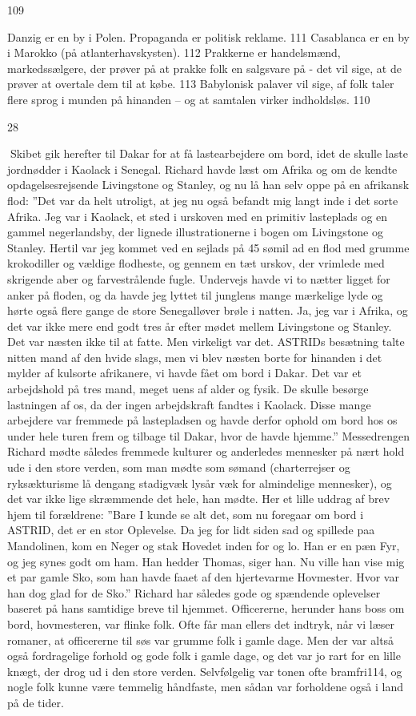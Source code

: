 109

Danzig er en by i Polen. Propaganda er politisk reklame. 111 Casablanca
er en by i Marokko (på atlanterhavskysten). 112 Prakkerne er
handelsmænd, markedssælgere, der prøver på at prakke folk en salgsvare
på - det vil sige, at de prøver at overtale dem til at købe. 113
Babylonisk palaver vil sige, af folk taler flere sprog i munden på
hinanden -- og at samtalen virker indholdsløs. 110

28

Skibet gik herefter til Dakar for at få lastearbejdere om bord, idet de
skulle laste jordnødder i Kaolack i Senegal. Richard havde læst om
Afrika og om de kendte opdagelsesrejsende Livingstone og Stanley, og nu
lå han selv oppe på en afrikansk flod: ''Det var da helt utroligt, at
jeg nu også befandt mig langt inde i det sorte Afrika. Jeg var i
Kaolack, et sted i urskoven med en primitiv lasteplads og en gammel
negerlandsby, der lignede illustrationerne i bogen om Livingstone og
Stanley. Hertil var jeg kommet ved en sejlads på 45 sømil ad en flod med
grumme krokodiller og vældige flodheste, og gennem en tæt urskov, der
vrimlede med skrigende aber og farvestrålende fugle. Undervejs havde vi
to nætter ligget for anker på floden, og da havde jeg lyttet til
junglens mange mærkelige lyde og hørte også flere gange de store
Senegalløver brøle i natten. Ja, jeg var i Afrika, og det var ikke mere
end godt tres år efter mødet mellem Livingstone og Stanley. Det var
næsten ikke til at fatte. Men virkeligt var det. ASTRIDs besætning talte
nitten mand af den hvide slags, men vi blev næsten borte for hinanden i
det mylder af kulsorte afrikanere, vi havde fået om bord i Dakar. Det
var et arbejdshold på tres mand, meget uens af alder og fysik. De skulle
besørge lastningen af os, da der ingen arbejdskraft fandtes i Kaolack.
Disse mange arbejdere var fremmede på lastepladsen og havde derfor
ophold om bord hos os under hele turen frem og tilbage til Dakar, hvor
de havde hjemme.'' Messedrengen Richard mødte således fremmede kulturer
og anderledes mennesker på nært hold ude i den store verden, som man
mødte som sømand (charterrejser og ryksækturisme lå dengang stadigvæk
lysår væk for almindelige mennesker), og det var ikke lige skræmmende
det hele, han mødte. Her et lille uddrag af brev hjem til forældrene:
''Bare I kunde se alt det, som nu foregaar om bord i ASTRID, det er en
stor Oplevelse. Da jeg for lidt siden sad og spillede paa Mandolinen,
kom en Neger og stak Hovedet inden for og lo. Han er en pæn Fyr, og jeg
synes godt om ham. Han hedder Thomas, siger han. Nu ville han vise mig
et par gamle Sko, som han havde faaet af den hjertevarme Hovmester. Hvor
var han dog glad for de Sko.'' Richard har således gode og spændende
oplevelser baseret på hans samtidige breve til hjemmet. Officererne,
herunder hans boss om bord, hovmesteren, var flinke folk. Ofte får man
ellers det indtryk, når vi læser romaner, at officererne til søs var
grumme folk i gamle dage. Men der var altså også fordragelige forhold og
gode folk i gamle dage, og det var jo rart for en lille knægt, der drog
ud i den store verden. Selvfølgelig var tonen ofte bramfri114, og nogle
folk kunne være temmelig håndfaste, men sådan var forholdene også i land
på de tider.

